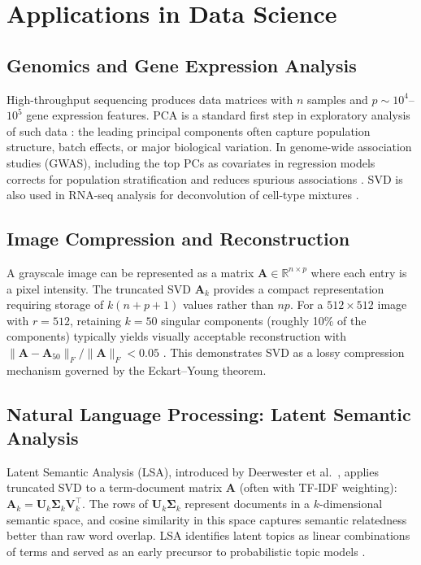 \documentclass[conference]{IEEEtran}
\begin{document}
\section{Applications in Data Science}
\label{sec:applications}

\subsection{Genomics and Gene Expression Analysis}

High-throughput sequencing produces data matrices with $n$ samples and $p \sim 10^4$--$10^5$ gene expression features. PCA is a standard first step in exploratory analysis of such data \cite{novembre2008}: the leading principal components often capture population structure, batch effects, or major biological variation. In genome-wide association studies (GWAS), including the top PCs as covariates in regression models corrects for population stratification and reduces spurious associations \cite{price2006}. SVD is also used in RNA-seq analysis for deconvolution of cell-type mixtures \cite{brunet2004}.

\subsection{Image Compression and Reconstruction}

A grayscale image can be represented as a matrix $\mathbf{A} \in \mathbb{R}^{n \times p}$ where each entry is a pixel intensity. The truncated SVD $\mathbf{A}_k$ provides a compact representation requiring storage of $k(n+p+1)$ values rather than $np$. For a $512\times512$ image with $r = 512$, retaining $k = 50$ singular components (roughly 10\% of the components) typically yields visually acceptable reconstruction with $\|\mathbf{A} - \mathbf{A}_{50}\|_F / \|\mathbf{A}\|_F < 0.05$ \cite{andrews1976}. This demonstrates SVD as a lossy compression mechanism governed by the Eckart--Young theorem.

\subsection{Natural Language Processing: Latent Semantic Analysis}

Latent Semantic Analysis (LSA), introduced by Deerwester et al.\ \cite{deerwester1990}, applies truncated SVD to a term-document matrix $\mathbf{A}$ (often with TF-IDF weighting): $\mathbf{A}_k = \mathbf{U}_k\mathbf{\Sigma}_k\mathbf{V}_k^\top$. The rows of $\mathbf{U}_k\mathbf{\Sigma}_k$ represent documents in a $k$-dimensional semantic space, and cosine similarity in this space captures semantic relatedness better than raw word overlap. LSA identifies latent topics as linear combinations of terms and served as an early precursor to probabilistic topic models \cite{blei2003}.
\end{document}
